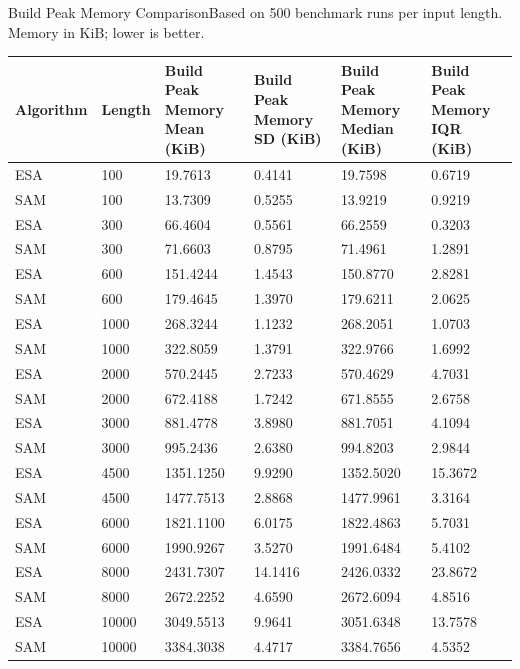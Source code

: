 \begin{benchmarktable}{Build Peak Memory Comparison}{Based on 500 benchmark runs per input length. Memory in KiB; lower is better.}
\begin{tabularx}{\textwidth}{|X|X|X|X|X|X|}
\toprule
Algorithm & Length & Build Peak Memory Mean (KiB) & Build Peak Memory SD (KiB) & Build Peak Memory Median (KiB) & Build Peak Memory IQR (KiB) \\
\midrule
ESA & 100 & 19.7613 & 0.4141 & 19.7598 & 0.6719 \\
SAM & 100 & 13.7309 & 0.5255 & 13.9219 & 0.9219 \\
\hline
ESA & 300 & 66.4604 & 0.5561 & 66.2559 & 0.3203 \\
SAM & 300 & 71.6603 & 0.8795 & 71.4961 & 1.2891 \\
\hline
ESA & 600 & 151.4244 & 1.4543 & 150.8770 & 2.8281 \\
SAM & 600 & 179.4645 & 1.3970 & 179.6211 & 2.0625 \\
\hline
ESA & 1000 & 268.3244 & 1.1232 & 268.2051 & 1.0703 \\
SAM & 1000 & 322.8059 & 1.3791 & 322.9766 & 1.6992 \\
\hline
ESA & 2000 & 570.2445 & 2.7233 & 570.4629 & 4.7031 \\
SAM & 2000 & 672.4188 & 1.7242 & 671.8555 & 2.6758 \\
\hline
ESA & 3000 & 881.4778 & 3.8980 & 881.7051 & 4.1094 \\
SAM & 3000 & 995.2436 & 2.6380 & 994.8203 & 2.9844 \\
\hline
ESA & 4500 & 1351.1250 & 9.9290 & 1352.5020 & 15.3672 \\
SAM & 4500 & 1477.7513 & 2.8868 & 1477.9961 & 3.3164 \\
\hline
ESA & 6000 & 1821.1100 & 6.0175 & 1822.4863 & 5.7031 \\
SAM & 6000 & 1990.9267 & 3.5270 & 1991.6484 & 5.4102 \\
\hline
ESA & 8000 & 2431.7307 & 14.1416 & 2426.0332 & 23.8672 \\
SAM & 8000 & 2672.2252 & 4.6590 & 2672.6094 & 4.8516 \\
\hline
ESA & 10000 & 3049.5513 & 9.9641 & 3051.6348 & 13.7578 \\
SAM & 10000 & 3384.3038 & 4.4717 & 3384.7656 & 4.5352 \\
\bottomrule
\end{tabularx}
\end{benchmarktable}

